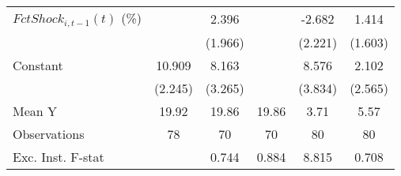 {\begin{tabular}{l*{5}{c}}
\addlinespace
$ FctShock_{i,t-1}(t)$ (\%)&                     &       2.396         &                     &      -2.682         &       1.414         \\
                    &                     &     (1.966)         &                     &     (2.221)         &     (1.603)         \\
\addlinespace
Constant            &      10.909\sym{***}&       8.163\sym{**} &                     &       8.576\sym{**} &       2.102         \\
                    &     (2.245)         &     (3.265)         &                     &     (3.834)         &     (2.565)         \\
\midrule
Mean Y              &       19.92         &       19.86         &       19.86         &        3.71         &        5.57         \\
Observations        &          78         &          70         &          70         &          80         &          80         \\
Exc. Inst. F-stat   &                     &       0.744         &       0.884         &       8.815         &       0.708         \\
\bottomrule
\end{tabular}
}
